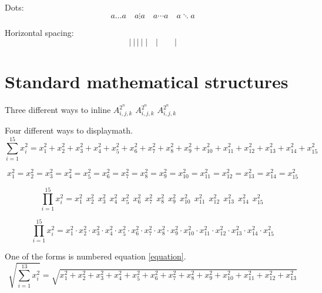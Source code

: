 Dots:
\begin{dmath}[compact,spread={1.250000\baselineskip}] a \ldots a \quad a \vdots a \quad  a \cdots a \quad  a \ddots a \end{dmath}

Horizontal spacing:
\begin{dmath}[compact,spread={1.250000\baselineskip}] |~|\,|\:|\;|\quad | \qquad | \end{dmath}

\section{Standard mathematical structures}

Three different ways to inline \begin{math}A_{i,j,k}^{2^n}\end{math} \(A_{i,j,k}^{2^n}\) \(A_{i,j,k}^{2^n}\)

Four different ways to displaymath.
\setcounter{equation}{99}
\begin{dmath}[compact,spread={1.250000\baselineskip},label=equation] \sum_{i=1}^{15} x_i^2 = x_1^2 + x_2^2 + x_3^2 + x_4^2 + x_5^2 + x_6^2 + x_7^2 + x_8^2 + x_9^2 + x_{10}^2 + x_{11}^2 + x_{12}^2 + x_{13}^2 + x_{14}^2 + x_{15}^2  \end{dmath}

\begin{dmath*}[compact,spread={1.250000\baselineskip}] x_1^2 = x_2^2 = x_3^2 = x_4^2 = x_5^2 = x_6^2 = x_7^2 = x_8^2 = x_9^2 = x_{10}^2 = x_{11}^2 = x_{12}^2 = x_{13}^2 = x_{14}^2 = x_{15}^2  \end{dmath*}

\begin{dmath*}[compact,spread={1.250000\baselineskip}]
\prod_{i=1}^{15} x_i^2 = x_1^2\ \ x_2^2\ \ x_3^2\ \ x_4^2\ \ x_5^2\ \ x_6^2\ \ x_7^2\ \ x_8^2\ \ x_9^2\ \ x_{10}^2\ \ x_{11}^2\ \ x_{12}^2\ \ x_{13}^2\ \ x_{14}^2\ \ x_{15}^2\ 
\end{dmath*}

\begin{dmath*}[compact,spread={1.250000\baselineskip}]
\prod_{i=1}^{15} x_i^2 = x_1^2 \cdot x_2^2 \cdot x_3^2 \cdot x_4^2 \cdot x_5^2 \cdot x_6^2 \cdot x_7^2 \cdot x_8^2 \cdot x_9^2 \cdot x_{10}^2 \cdot x_{11}^2 \cdot x_{12}^2 \cdot x_{13}^2 \cdot x_{14}^2 \cdot x_{15}^2 
\end{dmath*}

One of the forms is numbered equation \ref{equation}.
\begin{dmath*}[compact,spread={1.250000\baselineskip}]
\sqrt{\sum_{i=1}^{13} x_i^2} = \sqrt{x_1^2 + x_2^2 + x_3^2 + x_4^2 + x_5^2 + x_6^2 + x_7^2 + x_8^2 + x_9^2 + x_{10}^2+ x_{11}^2 + x_{12}^2 + x_{13}^2 }
\end{dmath*}

